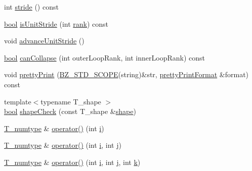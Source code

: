 \begin{DoxyCompactItemize}
\item 
int \hyperlink{classFastArrayIterator_a824c56ff5a30770e4c44df66c3376fa9}{stride} () const 
\item 
\hyperlink{compiler_8h_abb452686968e48b67397da5f97445f5b}{bool} \hyperlink{classFastArrayIterator_a5645f5cfaff90535a6f40d8acc9a73c7}{is\+Unit\+Stride} (int \hyperlink{classFastArrayIterator_a51a4638ef5e68f65172cfbdb764e28ac}{rank}) const 
\item 
void \hyperlink{classFastArrayIterator_aab48554b0429934788fecfcd4295bbb1}{advance\+Unit\+Stride} ()
\item 
\hyperlink{compiler_8h_abb452686968e48b67397da5f97445f5b}{bool} \hyperlink{classFastArrayIterator_ad00763fa8ded48210adf7f2c759a8966}{can\+Collapse} (int outer\+Loop\+Rank, int inner\+Loop\+Rank) const 
\item 
void \hyperlink{classFastArrayIterator_a84ee4b028a9f106c8ce7e6b07e489378}{pretty\+Print} (\hyperlink{numinquire_8h_a2b24ffc3b4ef9803956bc7715c6c7b83}{B\+Z\+\_\+\+S\+T\+D\+\_\+\+S\+C\+O\+P\+E}(string)\&str, \hyperlink{classprettyPrintFormat}{pretty\+Print\+Format} \&format) const 
\item 
{\footnotesize template$<$typename T\+\_\+shape $>$ }\\\hyperlink{compiler_8h_abb452686968e48b67397da5f97445f5b}{bool} \hyperlink{classFastArrayIterator_aeef8c3e99628c85af394717117946254}{shape\+Check} (const T\+\_\+shape \&\hyperlink{shape_8h_a9d9da3dcaecbbde6cf1961063f2e838b}{shape})
\item 
\hyperlink{classFastArrayIterator_a6b72f4ef8bfecc51f2f93b89b21d5033}{T\+\_\+numtype} \& \hyperlink{classFastArrayIterator_afee1415c886abc3700912fb0e1ba4664}{operator()} (int \hyperlink{indexexpr_8h_aabd77643995707c185e95c8cb2782c81}{i})
\item 
\hyperlink{classFastArrayIterator_a6b72f4ef8bfecc51f2f93b89b21d5033}{T\+\_\+numtype} \& \hyperlink{classFastArrayIterator_a091d674d485c406373d6a9c176544754}{operator()} (int \hyperlink{indexexpr_8h_aabd77643995707c185e95c8cb2782c81}{i}, int \hyperlink{indexexpr_8h_aa1f3325d66516548e69238097857fa98}{j})
\item 
\hyperlink{classFastArrayIterator_a6b72f4ef8bfecc51f2f93b89b21d5033}{T\+\_\+numtype} \& \hyperlink{classFastArrayIterator_a629c34277b65a5a7cb52b0194306ddc4}{operator()} (int \hyperlink{indexexpr_8h_aabd77643995707c185e95c8cb2782c81}{i}, int \hyperlink{indexexpr_8h_aa1f3325d66516548e69238097857fa98}{j}, int \hyperlink{indexexpr_8h_abb72938a198351550846b37a84588b63}{k})
\item 

\end{DoxyCompactItemize}
